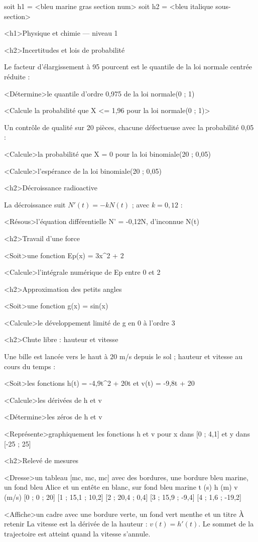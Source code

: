 \documentclass[marges=20, taille=11, precision=3]{texecole}
\begin{document}
soit h1 = <bleu marine gras section num>
soit h2 = <bleu italique sous-section>

<h1>Physique et chimie — niveau 1

<h2>Incertitudes et lois de probabilité

Le facteur d'élargissement à 95 pourcent est le quantile de la loi normale centrée réduite :

<Détermine>le quantile d'ordre 0,975 de la loi normale(0 ; 1)

<Calcule la probabilité que X <= 1,96 pour la loi normale(0 ; 1)>

Un contrôle de qualité sur 20 pièces, chacune défectueuse avec la probabilité 0,05 :

<Calcule>la probabilité que X = 0 pour la loi binomiale(20 ; 0,05)

<Calcule>l'espérance de la loi binomiale(20 ; 0,05)

<h2>Décroissance radioactive

La décroissance suit $N'(t) = -k N(t)$ ; avec $k = 0,12$ :

<Résous>l'équation différentielle N' = -0,12N, d'inconnue N(t)

<h2>Travail d'une force

<Soit>une fonction Ep(x) = 3x^2 + 2

<Calcule>l'intégrale numérique de Ep entre 0 et 2

<h2>Approximation des petits angles

<Soit>une fonction g(x) = sin(x)

<Calcule>le développement limité de g en 0 à l'ordre 3

<h2>Chute libre : hauteur et vitesse

Une bille est lancée vers le haut à $20$ m/s depuis le sol ; hauteur et vitesse au cours du temps :

<Soit>les fonctions h(t) = -4,9t^2 + 20t et v(t) = -9,8t + 20

<Calcule>les dérivées de h et v

<Détermine>les zéros de h et v

<Représente>graphiquement les fonctions h et v pour x dans [0 ; 4,1] et y dans [-25 ; 25]

<h2>Relevé de mesures

<Dresse>un tableau [mc, mc, mc] avec des bordures, une bordure bleu marine, un fond bleu Alice et un entête en blanc, sur fond bleu marine {
	t (s)	h (m)	v (m/s)
	[0 ; 0 ; 20]
	[1 ; 15,1 ; 10,2]
	[2 ; 20,4 ; 0,4]
	[3 ; 15,9 ; -9,4]
	[4 ; 1,6 ; -19,2]
}

<Affiche>un cadre avec une bordure verte, un fond vert menthe et un titre {À retenir} {
	La vitesse est la dérivée de la hauteur : $v(t) = h'(t)$. Le sommet
	de la trajectoire est atteint quand la vitesse s'annule.
}
\end{document}

